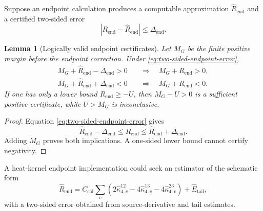 \documentclass[11pt]{article}
\newtheorem{lemma}[theorem]{Lemma}
\begin{document}
Suppose an endpoint calculation produces a computable approximation $\widehat R_{\mathrm{end}}$ and a certified two-sided error
\begin{equation}
  |R_{\mathrm{end}}-\widehat R_{\mathrm{end}}|\le\Delta_{\mathrm{end}}.
  \label{eq:two-sided-endpoint-error}
\end{equation}

\begin{lemma}[Logically valid endpoint certificates]
\label{lem:endpoint-certificates}
Let $M_G$ be the finite positive margin before the endpoint correction.  Under \eqref{eq:two-sided-endpoint-error},
\begin{align}
  M_G+\widehat R_{\mathrm{end}}-\Delta_{\mathrm{end}}>0
  &\quad\Longrightarrow\quad
  M_G+R_{\mathrm{end}}>0,
  \label{eq:endpoint-positive-certificate}\\
  M_G+\widehat R_{\mathrm{end}}+\Delta_{\mathrm{end}}<0
  &\quad\Longrightarrow\quad
  M_G+R_{\mathrm{end}}<0.
  \label{eq:endpoint-negative-certificate}
\end{align}
If one has only a lower bound $R_{\mathrm{end}}\ge-U$, then $M_G-U>0$ is a sufficient positive certificate, while $U>M_G$ is inconclusive.
\end{lemma}

\begin{proof}
Equation \eqref{eq:two-sided-endpoint-error} gives
\[
  \widehat R_{\mathrm{end}}-\Delta_{\mathrm{end}}
  \le R_{\mathrm{end}}
  \le\widehat R_{\mathrm{end}}+\Delta_{\mathrm{end}}.
\]
Adding $M_G$ proves both implications.  A one-sided lower bound cannot certify negativity.
\end{proof}

A heat-kernel endpoint implementation could seek an estimator of the schematic form
\begin{equation}
  \widehat R_{\mathrm{end}}
  =C_{\mathrm{col}}
  \sum_v\left(
  2\widehat\kappa_{4,v}^{12}
  -4\widehat\kappa_{4,v}^{13}
  -4\widehat\kappa_{4,v}^{23}
  \right)
  +\widehat E_{\mathrm{tail}},
  \label{eq:endpoint-estimator-template}
\end{equation}
with a two-sided error obtained from source-derivative and tail estimates.
\end{document}
